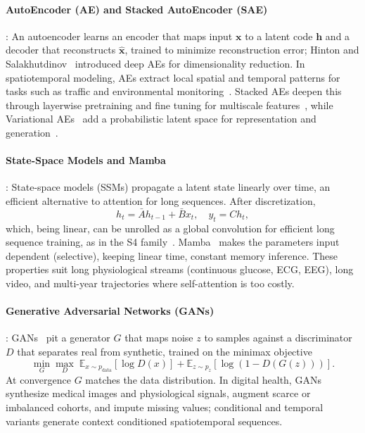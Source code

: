 \documentclass[journal]{IEEEtran}
\begin{document}
\paragraph{AutoEncoder (AE) and Stacked AutoEncoder (SAE)}: An autoencoder learns an encoder that maps input $\mathbf{x}$ to a latent code $\mathbf{h}$ and a decoder that reconstructs $\hat{\mathbf{x}}$, trained to minimize reconstruction error; Hinton and Salakhutdinov~\cite{hinton2006reducing} introduced deep AEs for dimensionality reduction. In spatiotemporal modeling, AEs extract local spatial and temporal patterns for tasks such as traffic and environmental monitoring~\cite{vincent2008extracting, bengio2009learning}. Stacked AEs deepen this through layerwise pretraining and fine tuning for multiscale features~\cite{erhan2010why, ranzato2007unsupervised, masci2011stacked, vincent2010stacked}, while Variational AEs~\cite{kingma2013auto} add a probabilistic latent space for representation and generation~\cite{glorot2010understanding, zhang2017deep, yu2018spatio}.

\paragraph{State-Space Models and Mamba}: State-space models (SSMs) propagate a latent state linearly over time, an efficient alternative to attention for long sequences. After discretization,
\begin{equation}
h_t = \bar{A} h_{t-1} + \bar{B} x_t, \quad y_t = C h_t,
\end{equation}
which, being linear, can be unrolled as a global convolution for efficient long sequence training, as in the S4 family~\cite{smith2023convssm}. Mamba~\cite{gu2023mamba} makes the parameters input dependent (selective), keeping linear time, constant memory inference. These properties suit long physiological streams (continuous glucose, ECG, EEG), long video, and multi-year trajectories where self-attention is too costly.

\paragraph{Generative Adversarial Networks (GANs)}: GANs~\cite{goodfellow2014gan} pit a generator $G$ that maps noise $z$ to samples against a discriminator $D$ that separates real from synthetic, trained on the minimax objective
\begin{equation}
\min_G \max_D \; \mathbb{E}_{x \sim p_{\text{data}}}[\log D(x)] + \mathbb{E}_{z \sim p_z}[\log (1 - D(G(z)))].
\end{equation}
At convergence $G$ matches the data distribution. In digital health, GANs synthesize medical images and physiological signals, augment scarce or imbalanced cohorts, and impute missing values; conditional and temporal variants generate context conditioned spatiotemporal sequences.
\end{document}
